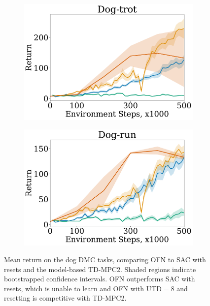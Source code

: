 \begin{figure}[t]
\begin{subfigure}[t]{0.25\textwidth}
    \end{subfigure}%
    \begin{subfigure}[t]{0.25\textwidth}
        \centering
        \includegraphics[width=\textwidth]{figures/dissecting/dog_exp/dog-trot.pdf}
    \end{subfigure}%
    \begin{subfigure}[t]{0.25\textwidth}
        \centering
        \includegraphics[width=\textwidth]{figures/dissecting/dog_exp/dog-run.pdf}
    \end{subfigure}%
    \caption{Mean return on the dog DMC tasks, comparing OFN to SAC with resets and the model-based TD-MPC2. Shaded regions indicate bootstrapped confidence intervals. OFN outperforms SAC with resets, which is unable to learn and OFN with $\mathrm{UTD}=8$ and resetting is competitive with TD-MPC2.}
    \label{fig:overestimation:all_dog}
\end{figure}

